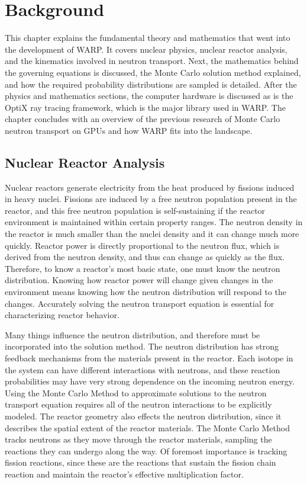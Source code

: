 \chapter{Background}
\label{chap:background}

This chapter explains the fundamental theory and mathematics that went into the development of WARP.  It covers nuclear physics, nuclear reactor analysis, and the kinematics involved in neutron transport.  Next, the mathematics behind the governing equations is discussed, the Monte Carlo solution method explained, and how the required probability distributions are sampled is detailed.  After the physics and mathematics sections, the computer hardware is discussed as is the OptiX ray tracing framework, which is the major library used in WARP.  The chapter concludes with an overview of the previous research of Monte Carlo neutron transport on GPUs and how WARP fits into the landscape.

\section{Nuclear Reactor Analysis}
\label{sec:analysis}

Nuclear reactors generate electricity from the heat produced by fissions induced in heavy nuclei.  Fissions are induced by a free neutron population present in the reactor, and this free neutron population is self-sustaining if the reactor environment is maintained within certain property ranges.  The neutron density in the reactor is much smaller than the nuclei density and it can change much more quickly.  Reactor power is directly proportional to the neutron flux, which is derived from the neutron density, and thus can change as quickly as the flux.  Therefore, to know a reactor's most basic state, one must know the neutron distribution.  Knowing how reactor power will change given changes in the environment means knowing how the neutron distribution will respond to the changes.  Accurately solving the neutron transport equation is essential for characterizing reactor behavior. 

Many things influence the neutron distribution, and therefore must be incorporated into the solution method.  The neutron distribution has strong feedback mechanisms from the materials present in the reactor.  Each isotope in the system can have different interactions with neutrons, and these reaction probabilities may have very strong dependence on the incoming neutron energy.  Using the Monte Carlo Method to approximate solutions to the neutron transport equation requires all of the neutron interactions to be explicitly modeled.  The reactor geometry also effects the neutron distribution, since it describes the spatial extent of the reactor materials.   The Monte Carlo Method tracks neutrons as they move through the reactor materials, sampling the reactions they can undergo along the way.  Of foremost importance is tracking fission reactions, since these are the reactions that sustain the fission chain reaction and maintain the reactor's effective multiplication factor.

